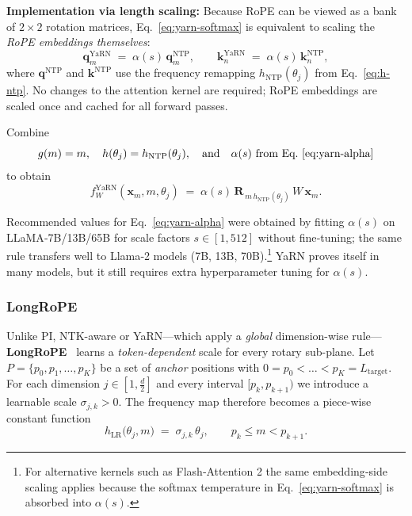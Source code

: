 \noindent\textbf{Implementation via length scaling:}
Because RoPE can be viewed as a bank of $2\times2$ rotation matrices,
Eq.~\eqref{eq:yarn-softmax} is equivalent to scaling the \emph{RoPE
embeddings themselves}:
\[
  \mathbf q_m^{\text{YaRN}}
    \;=\;
    \alpha(s)\,
    \mathbf q_m^{\text{NTP}},
  \qquad
  \mathbf k_n^{\text{YaRN}}
    \;=\;
    \alpha(s)\,
    \mathbf k_n^{\text{NTP}},
\]
where $\mathbf q^{\text{NTP}}$ and $\mathbf k^{\text{NTP}}$ use the
frequency remapping $h_{\text{NTP}}(\theta_j)$ from
Eq.~\eqref{eq:h-ntp}.  
No changes to the attention kernel are required; RoPE embeddings are
scaled once and cached for all forward passes.

\begin{definition}[YaRN]\label{def:yarn}
Combine
\[
  g(m)=m,\quad
  h(\theta_j)=h_{\text{NTP}}(\theta_j),\quad
  \text{and}\quad
  \alpha(s)\text{ from Eq.~\eqref{eq:yarn-alpha}}
\]
to obtain
\begin{equation}
  f_W^{\text{YaRN}}(\mathbf x_m,m,\theta_j)
  \;=\;
  \alpha(s)\,
  \mathbf R_{\,m\,h_{\text{NTP}}(\theta_j)}\,
  W\,\mathbf x_m.
  \label{eq:yarn-final}
\end{equation}
\end{definition}

Recommended values for Eq.~\eqref{eq:yarn-alpha} were obtained by
fitting $\alpha(s)$ on LLaMA‑7B/13B/65B for scale factors
$s\!\in\![1,512]$ without fine‑tuning; the same rule transfers well
to Llama‑2 models (7B, 13B, 70B).\footnote{%
  For alternative kernels such as Flash‑Attention 2 the same
  embedding‑side scaling applies because the softmax temperature in
  Eq.~\eqref{eq:yarn-softmax} is absorbed into $\alpha(s)$.} 
YaRN proves itself in many models, but it still requires extra hyperparameter tuning for $\alpha(s)$. 

\subsubsection{LongRoPE}
\label{sec:longrope}

Unlike PI, NTK-aware or YaRN—which apply a \emph{global}
dimension-wise rule—\textbf{LongRoPE}~\cite{ding2024longrope}  learns a \emph{token-dependent}
scale for every rotary sub-plane.  
Let \(P=\{p_0,p_1,\dots,p_K\}\) be a set of \emph{anchor} positions
with \(0=p_0<\dots<p_K=L_{\text{target}}\).
For each dimension \(j\in[1,\tfrac{d}{2}]\) and every interval
\([p_k,p_{k+1})\) we introduce a learnable scale
\(\sigma_{j,k}>0\).
The frequency map therefore becomes a piece-wise constant function
\begin{equation}
  h_{\text{LR}}\bigl(\theta_j,m\bigr)
  \;=\;
  \sigma_{j,k}\,\theta_j,
  \qquad
  p_k\le m < p_{k+1}.
  \label{eq:h-longrope}
\end{equation}

